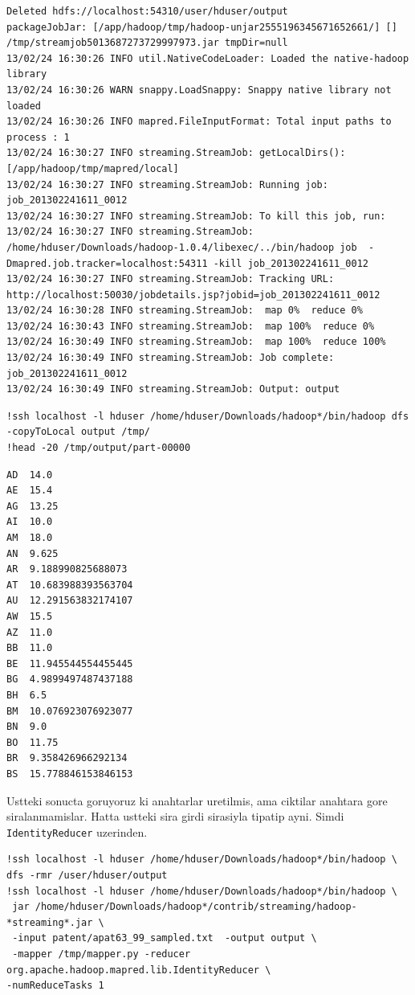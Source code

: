 \documentclass[12pt,fleqn]{article}\usepackage{../common}
\begin{document}
\begin{verbatim}
Deleted hdfs://localhost:54310/user/hduser/output
packageJobJar: [/app/hadoop/tmp/hadoop-unjar2555196345671652661/] [] /tmp/streamjob5013687273729997973.jar tmpDir=null
13/02/24 16:30:26 INFO util.NativeCodeLoader: Loaded the native-hadoop library
13/02/24 16:30:26 WARN snappy.LoadSnappy: Snappy native library not loaded
13/02/24 16:30:26 INFO mapred.FileInputFormat: Total input paths to process : 1
13/02/24 16:30:27 INFO streaming.StreamJob: getLocalDirs(): [/app/hadoop/tmp/mapred/local]
13/02/24 16:30:27 INFO streaming.StreamJob: Running job: job_201302241611_0012
13/02/24 16:30:27 INFO streaming.StreamJob: To kill this job, run:
13/02/24 16:30:27 INFO streaming.StreamJob: /home/hduser/Downloads/hadoop-1.0.4/libexec/../bin/hadoop job  -Dmapred.job.tracker=localhost:54311 -kill job_201302241611_0012
13/02/24 16:30:27 INFO streaming.StreamJob: Tracking URL: http://localhost:50030/jobdetails.jsp?jobid=job_201302241611_0012
13/02/24 16:30:28 INFO streaming.StreamJob:  map 0%  reduce 0%
13/02/24 16:30:43 INFO streaming.StreamJob:  map 100%  reduce 0%
13/02/24 16:30:49 INFO streaming.StreamJob:  map 100%  reduce 100%
13/02/24 16:30:49 INFO streaming.StreamJob: Job complete: job_201302241611_0012
13/02/24 16:30:49 INFO streaming.StreamJob: Output: output
\end{verbatim}

\begin{verbatim}
!ssh localhost -l hduser /home/hduser/Downloads/hadoop*/bin/hadoop dfs  -copyToLocal output /tmp/
!head -20 /tmp/output/part-00000
\end{verbatim}

\begin{verbatim}
AD	14.0
AE	15.4
AG	13.25
AI	10.0
AM	18.0
AN	9.625
AR	9.188990825688073
AT	10.683988393563704
AU	12.291563832174107
AW	15.5
AZ	11.0
BB	11.0
BE	11.945544554455445
BG	4.9899497487437188
BH	6.5
BM	10.076923076923077
BN	9.0
BO	11.75
BR	9.358426966292134
BS	15.778846153846153
\end{verbatim}

Ustteki sonucta goruyoruz ki anahtarlar uretilmis, ama ciktilar
anahtara gore siralanmamislar. Hatta ustteki sira girdi sirasiyla
tipatip ayni. Simdi \verb!IdentityReducer! uzerinden.

\begin{verbatim}
!ssh localhost -l hduser /home/hduser/Downloads/hadoop*/bin/hadoop \
dfs -rmr /user/hduser/output
!ssh localhost -l hduser /home/hduser/Downloads/hadoop*/bin/hadoop \
 jar /home/hduser/Downloads/hadoop*/contrib/streaming/hadoop-*streaming*.jar \
 -input patent/apat63_99_sampled.txt  -output output \
 -mapper /tmp/mapper.py -reducer org.apache.hadoop.mapred.lib.IdentityReducer \
-numReduceTasks 1 
\end{verbatim}
\end{document}
